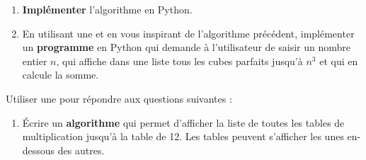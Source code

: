 \begin{boxexstheorieligne}
\begin{enumerate}[label=\alph*),itemsep=2mm]
\item {\bf Implémenter} l'algorithme en Python.
\item En utilisant une  et en vous inspirant de l'algorithme précédent, implémenter un \textbf{programme} en Python qui demande à l'utilisateur de saisir un nombre entier $n$, qui affiche dans une liste tous les cubes parfaits jusqu'à $n^3$ et qui en calcule la somme. \par\nobreak\@nobreaktrue
\end{enumerate}
\makeatother



\pagebreak[3]



%
%




\eexo
\pagebreak[3]



\exo
Utiliser une  pour répondre aux questions suivantes :


\vspace{3mm}
\begin{enumerate}[label=\alph*)]
\item Écrire un {\bf algorithme} qui permet d'afficher la liste de toutes les tables de multiplication jusqu'à la table de 12. Les tables peuvent s'afficher les unes en-dessous des autres.



\end{enumerate}
\end{boxexstheorieligne}
